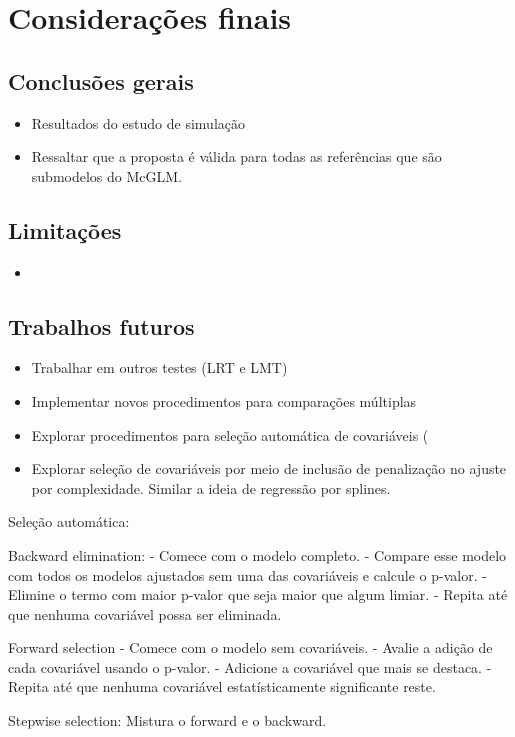 
\chapter{Considerações finais}


\section{Conclusões gerais}

\begin{itemize}
  \item Resultados do estudo de simulação
  \item Ressaltar que a proposta é válida para todas as referências que são submodelos do McGLM.
\end{itemize}


\section{Limitações}

\begin{itemize}
  \item 
\end{itemize}


\section{Trabalhos futuros}

\begin{itemize}
  \item Trabalhar em outros testes (LRT e LMT)
  \item Implementar novos procedimentos para comparações múltiplas
  \item Explorar procedimentos para seleção automática de covariáveis (
  \item Explorar seleção de covariáveis por meio de inclusão de penalização no ajuste por complexidade. Similar a ideia de regressão por splines.
\end{itemize}

Seleção automática:

Backward elimination:
  - Comece com o modelo completo.
  - Compare esse modelo com todos os modelos ajustados sem uma das covariáveis e calcule o p-valor.
  - Elimine o termo com maior p-valor que seja maior que algum limiar.
  - Repita até que nenhuma covariável possa ser eliminada.

Forward selection
  - Comece com o modelo sem covariáveis.
  - Avalie a adição de cada covariável usando o p-valor.
  - Adicione a covariável que mais se destaca.
  - Repita até que nenhuma covariável estatísticamente significante reste.

Stepwise selection: Mistura o forward e o backward.

